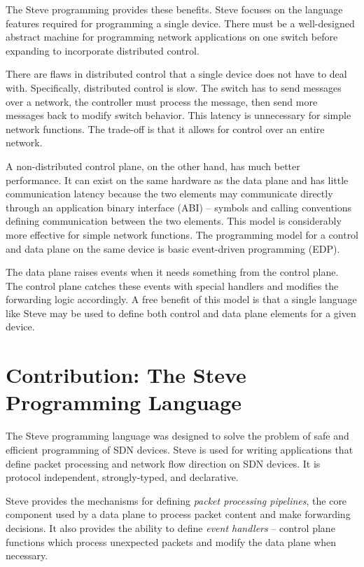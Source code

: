 The Steve programming provides these benefits.
Steve focuses on the language features required for programming a single device. There must be a well-designed abstract machine for programming network applications on one switch before expanding to incorporate distributed control.

There are flaws in distributed control that a single device does not have to deal with.
Specifically, distributed control is slow.
The switch has to send messages over a network, the controller must process the message, then send more messages back to modify switch behavior. This latency is unnecessary for simple network functions.
The trade-off is that it allows for control over an
entire network.

A non-distributed control plane, on the other hand, has much
better performance.
It can exist on the
same hardware as the data plane and has little communication latency
because the two elements may communicate directly through an application
binary interface (ABI) -- symbols and calling conventions defining communication between the two elements.
This model is considerably more effective for simple network functions.
The programming model for a control and data plane on the same device
is basic event-driven programming (EDP).

The data plane raises events when it needs something from the control plane.
The control plane catches these events with special handlers and modifies the
forwarding logic accordingly.
A free benefit of this model is that a single language like Steve may
be used to define both control and data plane elements for a given
device.

\section{Contribution: The Steve Programming Language}

The Steve programming language was designed to solve the problem of safe and efficient programming of SDN devices.
Steve is used for writing applications that define packet processing and network flow direction on SDN devices.
It is protocol independent, strongly-typed,
and declarative.

Steve provides the mechanisms for defining \emph{packet
processing pipelines}, the core component used by a data plane
to process packet content and make forwarding decisions.
It also provides the ability to define \emph{event handlers} --
control plane functions which process unexpected packets and
modify the data plane when necessary.

